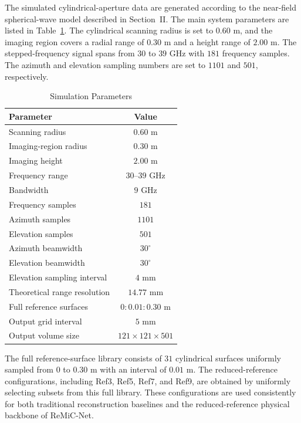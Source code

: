 \documentclass[journal]{IEEEtran}
\begin{document}
The simulated cylindrical-aperture data are generated according to the near-field spherical-wave model described in Section~II. The main system parameters are listed in Table~\ref{tab:simulation_parameters}. The cylindrical scanning radius is set to $0.60$ m, and the imaging region covers a radial range of $0.30$ m and a height range of $2.00$ m. The stepped-frequency signal spans from $30$ to $39$ GHz with $181$ frequency samples. The azimuth and elevation sampling numbers are set to $1101$ and $501$, respectively.

\begin{table}[t]
\caption{Simulation Parameters}
\label{tab:simulation_parameters}
\centering
\begin{tabular}{lc}
\hline
Parameter & Value \\
\hline
Scanning radius & $0.60$ m \\
Imaging-region radius & $0.30$ m \\
Imaging height & $2.00$ m \\
Frequency range & $30$--$39$ GHz \\
Bandwidth & $9$ GHz \\
Frequency samples & $181$ \\
Azimuth samples & $1101$ \\
Elevation samples & $501$ \\
Azimuth beamwidth & $30^{\circ}$ \\
Elevation beamwidth & $30^{\circ}$ \\
Elevation sampling interval & $4$ mm \\
Theoretical range resolution & $14.77$ mm \\
Full reference surfaces & $0:0.01:0.30$ m \\
Output grid interval & $5$ mm \\
Output volume size & $121\times121\times501$ \\
\hline
\end{tabular}
\end{table}

The full reference-surface library consists of $31$ cylindrical surfaces uniformly sampled from $0$ to $0.30$ m with an interval of $0.01$ m. The reduced-reference configurations, including Ref3, Ref5, Ref7, and Ref9, are obtained by uniformly selecting subsets from this full library. These configurations are used consistently for both traditional reconstruction baselines and the reduced-reference physical backbone of ReMiC-Net.
\end{document}
